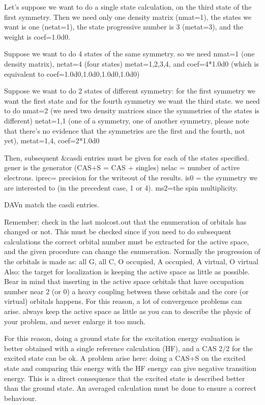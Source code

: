 \documentclass[11pt,a4paper]{article}
\begin{document}
Let's suppose we want to do a single state calculation, on the third state of
the first symmetry.  Then we need only one density matrix (nmat=1), the states
we want is one (netat=1), the state progressive number is 3 (metat=3), and the
weight is coef=1.0d0.

Suppose we want to do 4 states of the same symmetry. so we need nmat=1 (one
density matrix), netat=4 (four states) metat=1,2,3,4, and coef=4*1.0d0 (which
is equivalent to coef=1.0d0,1.0d0,1.0d0,1.0d0)

Suppose we want to do 2 states of different symmetry: for the first symmetry we
want the first state and for the fourth symmetry we want the third state. we
need to do nmat=2 (we need two density matrices since the symmetries of the
states is different) netat=1,1 (one of a symmetry, one of another symmetry,
please note that there's no evidence that the symmetries are the first and the
fourth, not yet), metat=1,4, coef=2*1.0d0

Then, subsequent \&casdi entries must be given for each of the states specified.
gener is the generator (CAS+S = CAS + singles) nelac = number of active
electrons. iprec= precision for the writeout of the results. is0 = the symmetry
we are interested to (in the precedent case, 1 or 4). ms2=the spin
multiplicity.

DAVn match the casdi entries.


Remember: check in the last molcost.out that the enumeration of orbitals has
changed or not. This must be checked since if you need to do subsequent
calculations the correct orbital number must be extracted for the active
space, and the given procedure can change the enumeration. Normally the
progression of the orbitals is made as: all G, all C, O occupied, A
occupied, A virtual, O virtual
Also: the target for localization is keeping the active space as little as
possible. Bear in mind that inserting in the active space orbitals that have
occupation number near 2 (or 0) a heavy coupling between these orbitals and
the core (or virtual) orbitals happens. For this reason, a lot of
convergence problems can arise. always keep the active space as little as
you can to describe the physic of your problem, and never enlarge it too
much.

For this reason, doing a ground state for the excitation energy evaluation
is better obtained with a single reference calculation (HF), and a CAS 2/2
for the excited state can be ok. A problem arise here: doing a CAS+S on the
excited state and comparing this energy with the HF energy can give negative
transition energy. This is a direct consequence that the excited state is
described better than the ground state. An averaged calculation must be done
to ensure a correct behaviour.
\end{document}
